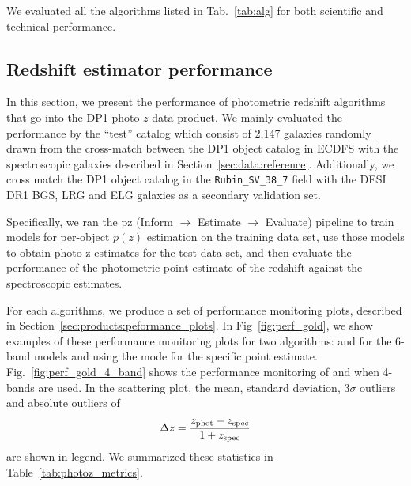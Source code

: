 We evaluated all the algorithms listed in Tab.~\ref{tab:alg} for both scientific and technical performance.

\subsection{Redshift estimator performance}
\label{sec:performance:pz}

In this section, we present the performance of photometric redshift algorithms that go into the DP1 photo-$z$ data product. We mainly evaluated the performance by the ``test'' catalog which consist of 2,147 galaxies randomly drawn from the cross-match between the DP1 object catalog in ECDFS with the spectroscopic galaxies described in Section~\ref{sec:data:reference}. Additionally, we cross match the DP1 object catalog in the \texttt{Rubin\_SV\_38\_7} field with the DESI DR1 BGS, LRG and ELG galaxies as a secondary validation set. 

Specifically, we ran the pz (Inform $\rightarrow$ Estimate $\rightarrow$ Evaluate) pipeline to train models for per-object $p(z)$ estimation on the training data set, use those models to obtain photo-z estimates for the test data set, and then evaluate the performance of the photometric point-estimate of the redshift against the spectroscopic estimates.

For each algorithms, we produce a set of performance monitoring plots, described in Section~\ref{sec:products:peformance_plots}. In Fig~\ref{fig:perf_gold}, we show examples of these performance monitoring plots for two algorithms:  and  for the 6-band models and using the mode for the specific point estimate. Fig.~\ref{fig:perf_gold_4_band} shows the performance monitoring of  and  when 4-bands are used. In the scattering plot, the mean, standard deviation, 3$\sigma$ outliers and absolute outliers of 
\begin{equation}
\label{eq:dz}
    \Delta z = \frac{z_{\rm phot} - z_{\rm spec}}{1+z_{\rm spec}}
\end{equation}
are shown in legend. We summarized these statistics in Table~\ref{tab:photoz_metrics}.

